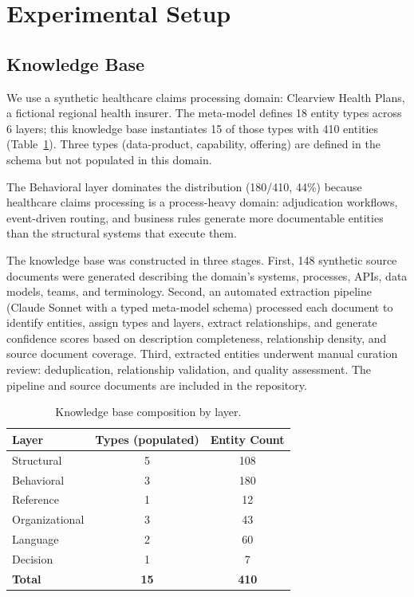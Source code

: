 \documentclass[11pt,a4paper]{article}
\begin{document}
\section{Experimental Setup}
\label{sec:setup}

\subsection{Knowledge Base}

We use a synthetic healthcare claims processing domain: Clearview Health Plans, a fictional regional health insurer. The meta-model defines 18 entity types across 6 layers; this knowledge base instantiates 15 of those types with 410 entities (Table~\ref{tab:kb-stats}). Three types (data-product, capability, offering) are defined in the schema but not populated in this domain.

The Behavioral layer dominates the distribution (180/410, 44\%) because healthcare claims processing is a process-heavy domain: adjudication workflows, event-driven routing, and business rules generate more documentable entities than the structural systems that execute them.

The knowledge base was constructed in three stages. First, 148 synthetic source documents were generated describing the domain's systems, processes, APIs, data models, teams, and terminology. Second, an automated extraction pipeline (Claude Sonnet with a typed meta-model schema) processed each document to identify entities, assign types and layers, extract relationships, and generate confidence scores based on description completeness, relationship density, and source document coverage. Third, extracted entities underwent manual curation review: deduplication, relationship validation, and quality assessment. The pipeline and source documents are included in the repository.

\begin{table}[t]
\centering
\caption{Knowledge base composition by layer.}
\label{tab:kb-stats}
\begin{tabular}{@{}lcc@{}}
\toprule
Layer & Types (populated) & Entity Count \\
\midrule
Structural & 5 & 108 \\
Behavioral & 3 & 180 \\
Reference & 1 & 12 \\
Organizational & 3 & 43 \\
Language & 2 & 60 \\
Decision & 1 & 7 \\
\midrule
\textbf{Total} & \textbf{15} & \textbf{410} \\
\bottomrule
\end{tabular}
\end{table}
\end{document}
